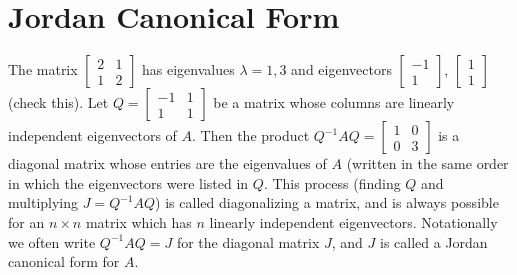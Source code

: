 \section{Jordan Canonical Form}
The matrix $\begin{bmatrix} 2&1\\1&2\end{bmatrix} $ has eigenvalues $\lambda=1,3$ and eigenvectors $\begin{bmatrix} -1\\1\end{bmatrix} $, $\begin{bmatrix} 1\\1\end{bmatrix} $ (check this). Let $Q = \begin {bmatrix} -1&1\\1&1\end {bmatrix} $ be a matrix whose columns are linearly independent eigenvectors of $A$.  Then the product $Q^{-1}AQ = \begin {bmatrix} 1&0\\0&3\end {bmatrix}$ is a diagonal matrix whose entries are the eigenvalues of $A$ (written in the same order in which the eigenvectors were listed in $Q$.  This process (finding $Q$ and multiplying $J=Q^{-1}AQ$) is called diagonalizing a matrix, and is always possible for an $n\times n$ matrix which has $n$ linearly independent eigenvectors. Notationally we often write $Q^{-1}AQ=J$ for the diagonal matrix $J$, and $J$ is called a Jordan canonical form for $A$.  

